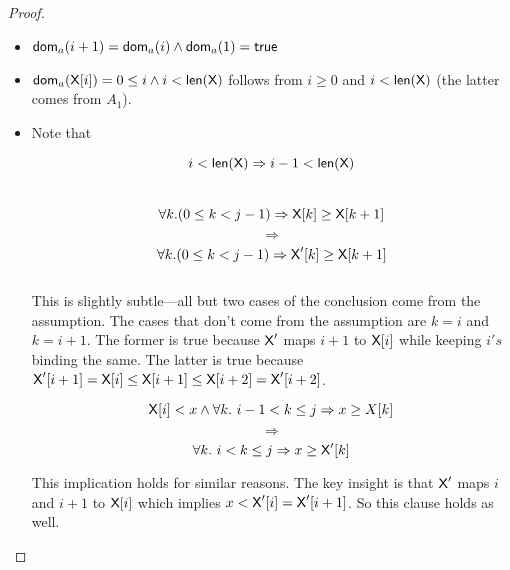 \begin{enumerate}[(a)]
\begin{enumerate}[i.]
\begin{proof}
        \begin{itemize}
        \item ${\sf dom}_a(i + 1) = {\sf dom}_a(i) \wedge {\sf dom}_a(1) = \textsf{true} $
        \item ${\sf dom}_a({\sf X}[i]) = 0 \leq i \wedge i < \textsf{len}(\textsf{X}) $ follows from
        $i \geq 0$ and $i < \textsf{len}(\textsf{X})$ (the latter comes from $A_1$).
        \item Note that

        $$i < \textsf{len}(\textsf{X}) \Rightarrow i - 1 < \textsf{len}(\textsf{X})$$ \\
        $$ \forall k. (0 \leq k < j - 1) \Rightarrow \textsf{X}[k] \geq \textsf{X}[k + 1] $$
        $$ \Rightarrow $$
        $$ \forall k. (0 \leq k < j - 1) \Rightarrow  \textsf{X}'[k] \geq \textsf{X}[k + 1] $$ \\
        This is slightly subtle---all but two cases of the conclusion come from the assumption. The
        cases that don't come from the assumption are $k = i$ and $k = i + 1$.
        The former is true because $\textsf{X}'$ maps $i + 1$ to $\textsf{X}[i]$ while keeping
        $i's$ binding the same. The latter is true because
        $\textsf{X}'[i + 1] = \textsf{X}[i] \leq \textsf{X}[i + 1] \leq \textsf{X}[i + 2] = \textsf{X}'[i + 2]$.

        $$ {\sf X}[i] < x \wedge \forall k .~i - 1 < k \leq j \Rightarrow  x \geq X[k] $$
        $$ \Rightarrow $$
        $$ \forall k .~i < k \leq j \Rightarrow  x \geq  \textsf{X}'[k] $$

        This implication holds for similar reasons. The key insight is that
        $\textsf{X}'$ maps $i$ and $i + 1$ to $\textsf{X}[i]$ which implies $x < \textsf{X}'[i] = \textsf{X}'[i + 1]$.
        So this clause holds as well.



        \end{itemize}




    \end{proof}
    \end{enumerate}


\end{enumerate}

